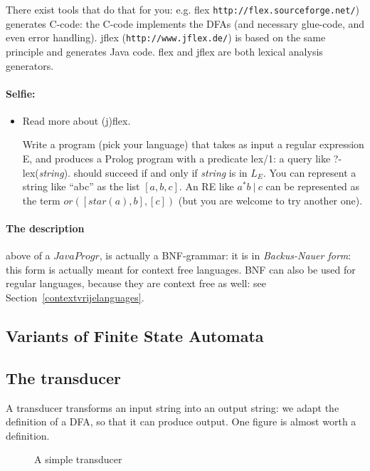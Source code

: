 There exist tools that do that for you: e.g. flex
\verb|http://flex.sourceforge.net/|) generates C-code: the C-code
implements the DFAs (and necessary glue-code, and even error
handling). jflex (\verb|http://www.jflex.de/|) is based on the same principle and generates Java code. flex and jflex are both lexical
analysis generators.

\paragraph{Selfie:}
\begin{itemize}
\item[]
Read more about (j)flex.

Write a program (pick your language) that takes as input a regular
expression E, and produces a Prolog program with a predicate lex/1: a
query like ?- lex({\em string}). should succeed if and only if {\em
  string} is in $L_E$. You can represent a string like ``abc'' as the
list $[a,b,c]$. An RE like $a^*b~|~c$ can be represented as the term
$or([star(a),b],[c])$ (but you are welcome to try another one).
\end{itemize}

\paragraph{The description} above of a $JavaProgr$, is actually a
BNF-grammar: it is in {\em Backus-Nauer form}: this form is actually
meant for context free languages. BNF can also be used for regular
languages, because they are context free as well: see
Section~\ref{contextvrijelanguages}.

\subsection{Variants of Finite State Automata}

\subsection{The transducer}


A transducer transforms an input string into an output string: we
adapt the definition of a DFA, so that it can produce output. One
figure is almost worth a definition.

\begin{figure}[h]
\caption{A simple transducer \label{trans1}}
\end{figure}

